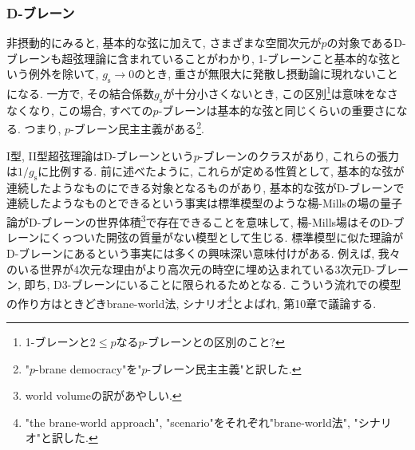 \documentclass[10pt,a4paper]{jsarticle}
\begin{document}
\subsubsection*{D-ブレーン}
非摂動的にみると, 基本的な弦に加えて, さまざまな空間次元が$p$の対象であるD-ブレーンも超弦理論に含まれていることがわかり, 1-ブレーンこと基本的な弦という例外を除いて, $g_{\mathrm{s}} \to 0$のとき, 重さが無限大に発散し摂動論に現れないことになる. 一方で, その結合係数$g_{\mathrm{s}}$が十分小さくないとき, この区別\footnote{1-ブレーンと$2 \leq p$なる$p$-ブレーンとの区別のこと? }は意味をなさなくなり, この場合, すべての$p$-ブレーンは基本的な弦と同じくらいの重要さになる. つまり, $p$-ブレーン民主主義がある\footnote{"$p$-brane democracy"を"$p$-ブレーン民主主義"と訳した. }. \par
I型, II型超弦理論はD-ブレーンという$p$-ブレーンのクラスがあり, これらの張力は$1 / g_{\mathrm{s}} $に比例する. 前に述べたように, これらが定める性質として, 基本的な弦が連続したようなものにできる対象となるものがあり, 基本的な弦がD-ブレーンで連続したようなものとできるという事実は標準模型のような楊-Millsの場の量子論がD-ブレーンの世界体積\footnote{world volumeの訳があやしい. }で存在できることを意味して, 楊-Mills場はそのD-ブレーンにくっついた開弦の質量がない模型として生じる. 標準模型に似た理論がD-ブレーンにあるという事実には多くの興味深い意味付けがある. 例えば, 我々のいる世界が4次元な理由がより高次元の時空に埋め込まれている3次元D-ブレーン, 即ち, D3-ブレーンにいることに限られるためとなる. こういう流れでの模型の作り方はときどきbrane-world法, シナリオ\footnote{"the brane-world approach", "scenario"をそれぞれ"brane-world法", "シナリオ"と訳した. }とよばれ, 第10章で議論する. 
\end{document}
